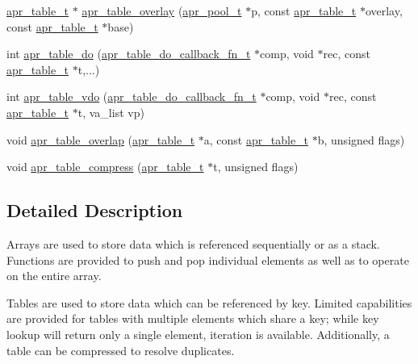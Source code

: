 \begin{DoxyCompactItemize}
\item 
\hyperlink{group__apr__tables_gad7ea82d6608a4a633fc3775694ab71e4}{apr\-\_\-table\-\_\-t} $\ast$ \hyperlink{group__apr__tables_ga783b5c439d46c109bb45e7bc1a6d7ef2}{apr\-\_\-table\-\_\-overlay} (\hyperlink{group__apr__pools_gaf137f28edcf9a086cd6bc36c20d7cdfb}{apr\-\_\-pool\-\_\-t} $\ast$p, const \hyperlink{group__apr__tables_gad7ea82d6608a4a633fc3775694ab71e4}{apr\-\_\-table\-\_\-t} $\ast$overlay, const \hyperlink{group__apr__tables_gad7ea82d6608a4a633fc3775694ab71e4}{apr\-\_\-table\-\_\-t} $\ast$base)
\item 
int \hyperlink{group__apr__tables_ga5917e542ae910961ee48b0ec2d09a879}{apr\-\_\-table\-\_\-do} (\hyperlink{group__apr__tables_ga0a59d6b321ade650c7cfa31d7fa93dcc}{apr\-\_\-table\-\_\-do\-\_\-callback\-\_\-fn\-\_\-t} $\ast$comp, void $\ast$rec, const \hyperlink{group__apr__tables_gad7ea82d6608a4a633fc3775694ab71e4}{apr\-\_\-table\-\_\-t} $\ast$t,...)
\item 
int \hyperlink{group__apr__tables_ga753c5247c9cd7f90c8958b64d9b6aeae}{apr\-\_\-table\-\_\-vdo} (\hyperlink{group__apr__tables_ga0a59d6b321ade650c7cfa31d7fa93dcc}{apr\-\_\-table\-\_\-do\-\_\-callback\-\_\-fn\-\_\-t} $\ast$comp, void $\ast$rec, const \hyperlink{group__apr__tables_gad7ea82d6608a4a633fc3775694ab71e4}{apr\-\_\-table\-\_\-t} $\ast$t, va\-\_\-list vp)
\item 
void \hyperlink{group__apr__tables_ga603ebc9b97703b855f8ad77640165372}{apr\-\_\-table\-\_\-overlap} (\hyperlink{group__apr__tables_gad7ea82d6608a4a633fc3775694ab71e4}{apr\-\_\-table\-\_\-t} $\ast$a, const \hyperlink{group__apr__tables_gad7ea82d6608a4a633fc3775694ab71e4}{apr\-\_\-table\-\_\-t} $\ast$b, unsigned flags)
\item 
void \hyperlink{group__apr__tables_ga7f2a652a0cdaf8c20588823c97a3007f}{apr\-\_\-table\-\_\-compress} (\hyperlink{group__apr__tables_gad7ea82d6608a4a633fc3775694ab71e4}{apr\-\_\-table\-\_\-t} $\ast$t, unsigned flags)
\end{DoxyCompactItemize}


\subsection{Detailed Description}
Arrays are used to store data which is referenced sequentially or as a stack. Functions are provided to push and pop individual elements as well as to operate on the entire array.

Tables are used to store data which can be referenced by key. Limited capabilities are provided for tables with multiple elements which share a key; while key lookup will return only a single element, iteration is available. Additionally, a table can be compressed to resolve duplicates.


